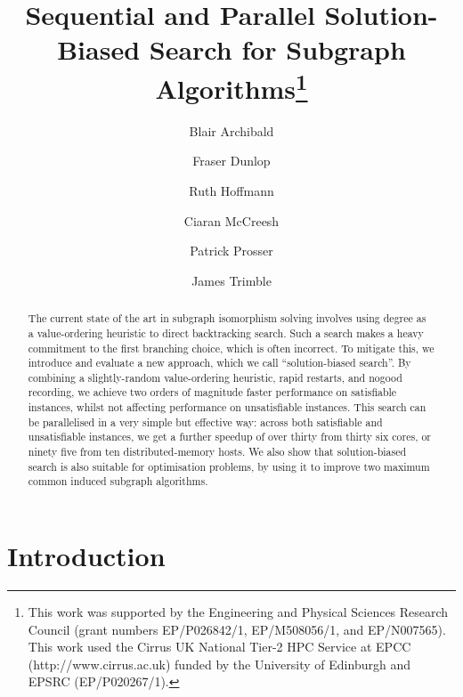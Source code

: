 \documentclass[runningheads]{llncs}
\begin{document}
\title{Sequential and Parallel Solution-Biased Search for Subgraph Algorithms\thanks{This work was
supported by the Engineering and Physical Sciences Research Council (grant numbers EP/P026842/1,
EP/M508056/1, and EP/N007565). This work used the Cirrus UK National Tier-2 HPC Service at EPCC
(http://www.cirrus.ac.uk) funded by the University of Edinburgh and EPSRC (EP/P020267/1).}}

\author{Blair Archibald\and
Fraser Dunlop\and
Ruth Hoffmann\and
Ciaran McCreesh\and
Patrick Prosser \and
James Trimble}



\maketitle

\begin{abstract}
    The current state of the art in subgraph isomorphism solving involves using degree as a
    value-ordering heuristic to direct backtracking search. Such a search makes a heavy commitment
    to the first branching choice, which is often incorrect. To mitigate this, we introduce and
    evaluate a new approach, which we call ``solution-biased search''. By combining a
    slightly-random value-ordering heuristic, rapid restarts, and nogood recording, we achieve two
    orders of magnitude faster performance on satisfiable instances, whilst not affecting
    performance on unsatisfiable instances. This search can be parallelised in a very simple
    but effective way: across both satisfiable and unsatisfiable instances, we get a further speedup
    of over thirty from thirty six cores, or ninety five from ten distributed-memory hosts.  We also
    show that solution-biased search is also suitable for optimisation problems, by using it to
    improve two maximum common induced subgraph algorithms.
\end{abstract}

\section{Introduction}
\end{document}
